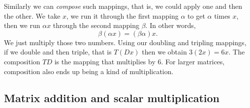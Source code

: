 Similarly we can \emph{compose} such mappings, that
is, we could apply one and then the other.  We take $x$, we run it through
the first mapping $\alpha$ to get $\alpha$ times $x$, then we run
$\alpha x$ through the second mapping $\beta$.  In other words,
\begin{equation*}
\beta ( \alpha x ) = (\beta \alpha) x .
\end{equation*}
We just multiply those two numbers.  Using our doubling
and tripling mappings, if we double and then triple, that is $T(Dx)$ then
we obtain $3(2x) = 6x$.  The composition $TD$ is the mapping that multiplies
by $6$.  For larger matrices, composition also ends up being a kind of
multiplication.

\subsection{Matrix addition and scalar multiplication}

